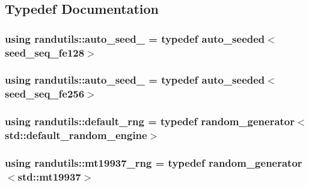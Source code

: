 \subsection{Typedef Documentation}
\hypertarget{namespacerandutils_ac122072eca2bd6dc81a557e59147099c}{}
\subsubsection[{auto\+\_\+seed\+\_\+128}]{\setlength{\rightskip}{0pt plus 5cm}using {\bf randutils\+::auto\+\_\+seed\+\_} = typedef {\bf auto\+\_\+seeded}$<${\bf seed\+\_\+seq\+\_\+fe128}$>$}\label{namespacerandutils_ac122072eca2bd6dc81a557e59147099c}
\hypertarget{namespacerandutils_a96647abcb6ceb1ef0c3cf7c8875ae298}{}
\subsubsection[{auto\+\_\+seed\+\_\+256}]{\setlength{\rightskip}{0pt plus 5cm}using {\bf randutils\+::auto\+\_\+seed\+\_} = typedef {\bf auto\+\_\+seeded}$<${\bf seed\+\_\+seq\+\_\+fe256}$>$}\label{namespacerandutils_a96647abcb6ceb1ef0c3cf7c8875ae298}
\hypertarget{namespacerandutils_a541e8d25081229bd349f2a5facb915a1}{}
\subsubsection[{default\+\_\+rng}]{\setlength{\rightskip}{0pt plus 5cm}using {\bf randutils\+::default\+\_\+rng} = typedef {\bf random\+\_\+generator}$<$std\+::default\+\_\+random\+\_\+engine$>$}\label{namespacerandutils_a541e8d25081229bd349f2a5facb915a1}
\hypertarget{namespacerandutils_a7ad409d0cae7ed019fd23cc64e3f764f}{}
\subsubsection[{mt19937\+\_\+rng}]{\setlength{\rightskip}{0pt plus 5cm}using {\bf randutils\+::mt19937\+\_\+rng} = typedef {\bf random\+\_\+generator}$<$std\+::mt19937$>$}\label{namespacerandutils_a7ad409d0cae7ed019fd23cc64e3f764f}
\hypertarget{namespacerandutils_a2b7c80226592f2cfc2dd51ef1b6a6648}{}
